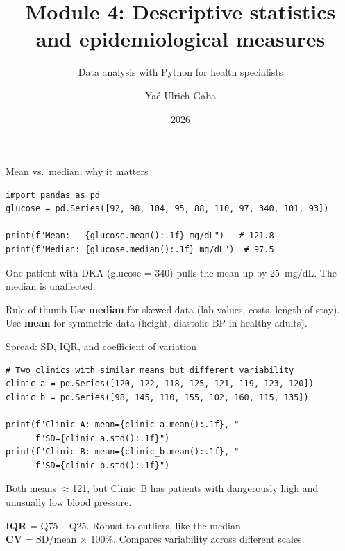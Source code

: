 \documentclass[aspectratio=169,11pt]{beamer}
\title{Module 4: Descriptive statistics and epidemiological measures}
\subtitle{Data analysis with Python for health specialists}
\author{Yaé Ulrich Gaba}
\institute{AIRINA Labs}
\date{2026}
\begin{document}
\maketitle

\begin{frame}[fragile]{Mean vs.\ median: why it matters}
\begin{verbatim}
import pandas as pd
glucose = pd.Series([92, 98, 104, 95, 88, 110, 97, 340, 101, 93])

print(f"Mean:   {glucose.mean():.1f} mg/dL")   # 121.8
print(f"Median: {glucose.median():.1f} mg/dL")  # 97.5
\end{verbatim}

\vspace{6pt}
One patient with DKA (glucose = 340) pulls the mean up by 25~mg/dL. The median is unaffected.

\vspace{6pt}
\begin{alertblock}{Rule of thumb}
Use \textbf{median} for skewed data (lab values, costs, length of stay). Use \textbf{mean} for symmetric data (height, diastolic BP in healthy adults).
\end{alertblock}
\end{frame}

\begin{frame}[fragile]{Spread: SD, IQR, and coefficient of variation}
\begin{verbatim}
# Two clinics with similar means but different variability
clinic_a = pd.Series([120, 122, 118, 125, 121, 119, 123, 120])
clinic_b = pd.Series([98, 145, 110, 155, 102, 160, 115, 135])

print(f"Clinic A: mean={clinic_a.mean():.1f}, "
      f"SD={clinic_a.std():.1f}")
print(f"Clinic B: mean={clinic_b.mean():.1f}, "
      f"SD={clinic_b.std():.1f}")
\end{verbatim}

\vspace{4pt}
Both means $\approx$121, but Clinic~B has patients with \alert{dangerously high and unusually low} blood pressure.

\vspace{4pt}
\textbf{IQR} = Q75 -- Q25. Robust to outliers, like the median.\\
\textbf{CV} = SD/mean $\times$ 100\%. Compares variability across different scales.
\end{frame}
\end{document}

